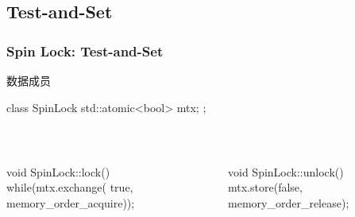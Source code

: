\documentclass[UTF8,lualatex]{ctexbeamer}
\begin{document}

\subsection{Test-and-Set}

\begin{frame}[fragile]
    \frametitle{Spin Lock: Test-and-Set}
    \scriptsize
    \begin{block}{数据成员}
        \begin{cppcode}
            class SpinLock {
                std::atomic<bool> mtx;
            };
        \end{cppcode}
    \end{block}
    \begin{columns}[t]
        \begin{column}{.5\textwidth}
            \begin{block}{~}
                \begin{cppcode}
                    void SpinLock::lock() {
                        while(mtx.exchange(
                            true,
                            memory_order_acquire));
                    }
                \end{cppcode}
            \end{block}
        \end{column}
        \begin{column}{.5\textwidth}
            \begin{block}{~}
                \begin{cppcode}
                    void SpinLock::unlock() {
                        mtx.store(false,
                            memory_order_release);
                    }
                \end{cppcode}
            \end{block}
        \end{column}
    \end{columns}
\end{frame}

\end{document}
